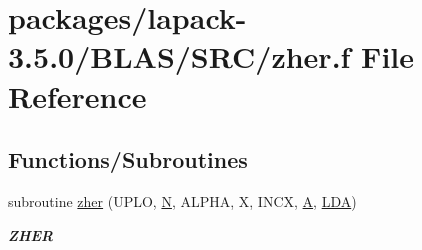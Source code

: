 \hypertarget{lapack-3_85_80_2BLAS_2SRC_2zher_8f}{}\section{packages/lapack-\/3.5.0/\+B\+L\+A\+S/\+S\+R\+C/zher.f File Reference}
\label{lapack-3_85_80_2BLAS_2SRC_2zher_8f}
\subsection*{Functions/\+Subroutines}
\begin{DoxyCompactItemize}
\item 
subroutine \hyperlink{group__complex16__blas__level2_gab493f9f41552f058ed4f75e7d182ed65}{zher} (U\+P\+L\+O, \hyperlink{polmisc_8c_a0240ac851181b84ac374872dc5434ee4}{N}, A\+L\+P\+H\+A, X, I\+N\+C\+X, \hyperlink{classA}{A}, \hyperlink{example__user_8c_ae946da542ce0db94dced19b2ecefd1aa}{L\+D\+A})
\begin{DoxyCompactList}\small\item\em {\bfseries Z\+H\+E\+R} \end{DoxyCompactList}\end{DoxyCompactItemize}
